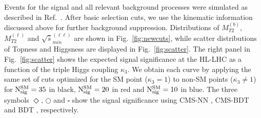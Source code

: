 Events for the signal and all relevant background processes were simulated as described in Ref.~\cite{Kim:2018cxf}. After basic selection cuts, we use the kinematic information  discussed above for further background suppression. Distributions of $M_{T2}^{(b)}$, $M_{T2}^{(\ell)}$ and $\sqrt{\hat{s}}_{min}^{(\ell\ell)}$ are shown in Fig.~\ref{fig:newcuts}, while scatter distributions of Topness and Higgsness are displayed in Fig.~\ref{fig:scatter}. 
%
The right panel in Fig.~\ref{fig:scatter} shows the expected signal significance at the HL-LHC as a function of the triple Higgs coupling $\kappa_3$. We obtain each curve by applying the same set of cuts optimized for the SM point ($\kappa_3=1$) to non-SM points ($\kappa_3 \neq 1$) for ${\rm N_{sig}^{SM}}=35$ in black, ${\rm N_{sig}^{SM}}=20$ in red and ${\rm N_{sig}^{SM}}=10$ in blue. The three symbols {\color{red}$\Diamond$}, {\color{black}$\bigcirc$} and {\color{blue}$\square$} show the signal significance using CMS-NN \cite{CMS:2015nat}, CMS-BDT \cite{CMS:2017cwx} and BDT \cite{Adhikary:2017jtu}, respectively.




